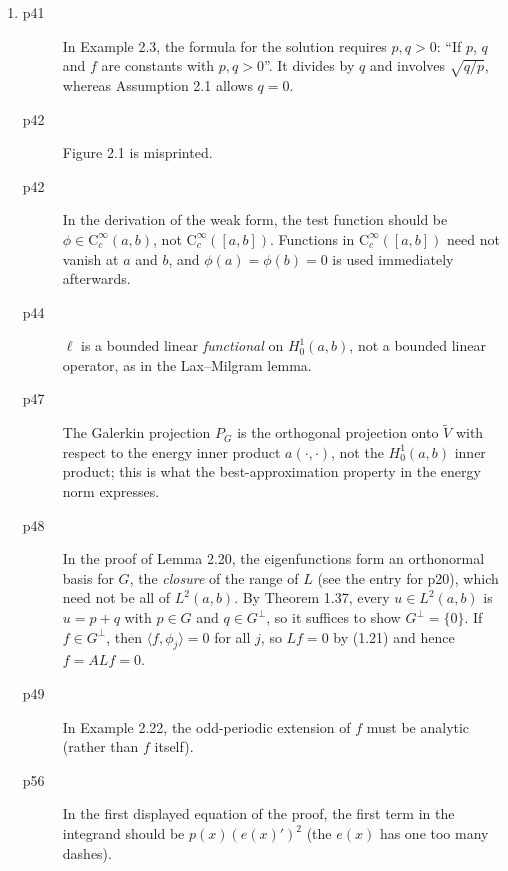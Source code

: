 \documentclass[final]{article}
\theoremstyle{definition}
\begin{document}
\begin{enumerate}
 \item%
   \begin{description}
   \item[p41] In Example 2.3, the formula for the solution requires $p,q>0$:
``If $p$, $q$ and $f$ are constants with $p,q>0$''. It divides by $q$ and
involves $\sqrt{q/p}$, whereas Assumption 2.1 allows $q=0$.
   \item[p42] Figure 2.1 is misprinted.
   \item[p42] In the derivation of the weak form, the test function should be
$\phi\in\mathrm{C}^\infty_c(a,b)$, not $\mathrm{C}^\infty_c([a,b])$. Functions in
$\mathrm{C}^\infty_c([a,b])$ need not vanish at $a$ and $b$, and
$\phi(a)=\phi(b)=0$ is used immediately afterwards.
   \item[p44] $\ell$ is a bounded linear \emph{functional} on
$H^1_0(a,b)$, not a bounded linear operator, as in the Lax--Milgram lemma.
   \item[p47] The Galerkin projection $P_G$ is the orthogonal projection onto
$\tilde V$ with respect to the energy inner product $a(\cdot,\cdot)$, not the
$H^1_0(a,b)$ inner product; this is what the best-approximation property in the
energy norm expresses.
   \item[p48] In the proof of Lemma 2.20, the eigenfunctions form an
orthonormal basis for $G$, the \emph{closure} of the range of $L$ (see the
entry for p20), which need not be all of $L^2(a,b)$. By Theorem 1.37, every
$u\in L^2(a,b)$ is $u=p+q$ with $p\in G$ and $q\in G^\perp$, so it suffices to
show $G^\perp=\{0\}$. If $f\in G^\perp$, then $\langle f,\phi_j\rangle=0$ for
all $j$, so $Lf=0$ by (1.21) and hence $f=ALf=0$.
   \item[p49] In Example 2.22,  the odd-periodic extension of $f$ must be analytic (rather than  $f$ itself).
   \item[p56] In the first displayed equation of the proof, the first term in the integrand should be $p(x)(e(x)')^2$ (the $e(x)$ has one too many dashes).

\end{description}
\end{enumerate}
\end{document}
